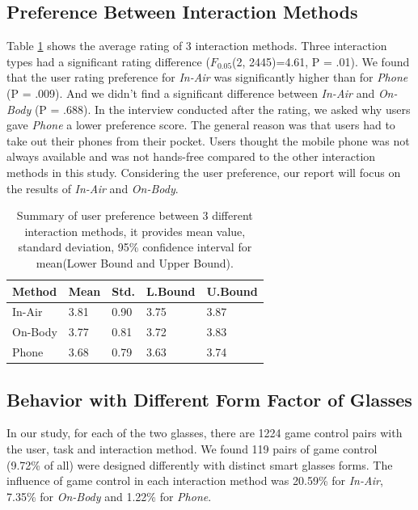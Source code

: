 \documentclass{sigchi}
\newcommand\tabhead[1]{\small\textbf{#1}}
\begin{document}
  \subsection{Preference Between Interaction Methods}
  Table \ref{tab:tablePreferenceInteractionMethod} shows the average rating of 3 interaction methods. Three interaction types had a significant rating difference ($F_{0.05}$(2, 2445)=4.61, P = .01). We found that the user rating preference for \emph{In-Air} was significantly higher than for \emph{Phone} (P = .009). And we didn't find a significant difference between \emph{In-Air} and \emph{On-Body} (P = .688).
  In the interview conducted after the rating, we asked why users gave \emph{Phone} a lower preference score.
  The general reason was that users had to take out their phones from their pocket. Users thought the mobile phone was not always available and was not hands-free compared to the other interaction methods in this study. Considering the user preference, our report will focus on the results of \emph{In-Air} and \emph{On-Body}.

  \begin{table}
    \centering
    \begin{tabular}{|l|l|l|l|l|}
      \hline
      \tabhead{Method} &
      \multicolumn{1}{|p{0.13\columnwidth}|}{\centering\tabhead{Mean}} &
      \multicolumn{1}{|p{0.13\columnwidth}|}{\centering\tabhead{Std.}} &
      \multicolumn{1}{|p{0.13\columnwidth}|}{\centering\tabhead{L.Bound}} &
      \multicolumn{1}{|p{0.13\columnwidth}|}{\centering\tabhead{U.Bound}} \\
      \hline
      In-Air & 3.81 & 0.90 & 3.75 & 3.87\\
      \hline
      On-Body & 3.77 & 0.81 & 3.72 & 3.83\\
      \hline
      Phone & 3.68 & 0.79 & 3.63 & 3.74\\
      \hline

    \end{tabular}
    \caption{Summary of user preference between 3 different interaction methods, it provides mean value, standard deviation, 95\% confidence interval for mean(Lower Bound and Upper Bound).}
    \label{tab:tablePreferenceInteractionMethod}
  \end{table}

  \subsection{Behavior with Different Form Factor of Glasses}
  In our study, for each of the two glasses, there are 1224 game control pairs with the user, task and interaction method. We found 119 pairs of game control (9.72\% of all) were designed differently with distinct smart glasses forms. The influence of game control in each interaction method was 20.59\% for \emph{In-Air}, 7.35\% for \emph{On-Body} and 1.22\% for \emph{Phone}. 
\end{document}
